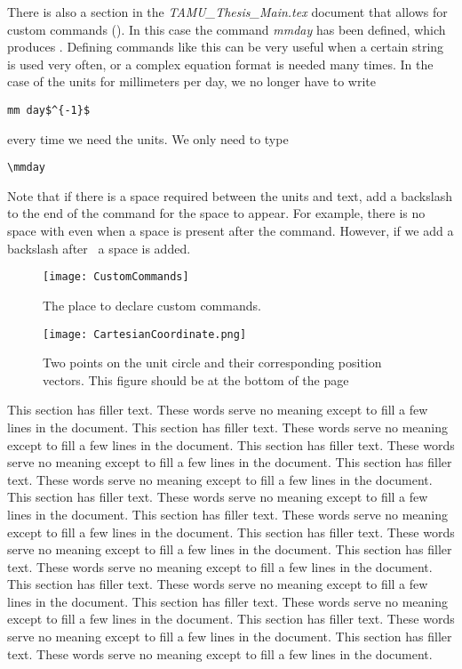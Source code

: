 There is also a section in the \textit{TAMU\_Thesis\_Main.tex} document that allows for custom commands (). In this case the command {\it mmday} has been defined, which produces \mmday. Defining commands like this can be very useful when a certain string is used very often, or a complex equation format is needed many times. In the case of the units for millimeters per day, we no longer have to write
\begin{verbatim}
mm day$^{-1}$
\end{verbatim}
every time we need the units. We only need to type
\begin{verbatim}
\mmday
\end{verbatim}
Note that if there is a space required between the units and text, add a backslash to the end of the command for the space to appear. For example, there is no space with \mmday even when a space is present after the command. However, if we add a backslash after \mmday\ a space is added.

\begin{figure}[ht]
	\centering
	\texttt{[image: CustomCommands]}
	\caption{The place to declare custom commands.}
	\label{fig:custom_commands}
\end{figure}

\begin{figure}[!b]
	\centering
	\texttt{[image: CartesianCoordinate.png]}
	\caption{Two points on the unit circle and their corresponding position vectors. This figure should be at the bottom of the page}
\end{figure}

This section has filler text. These words serve no meaning except to fill a few lines in the document. This section has filler text. These words serve no meaning except to fill a few lines in the document. This section has filler text. These words serve no meaning except to fill a few lines in the document. This section has filler text. These words serve no meaning except to fill a few lines in the document. This section has filler text. These words serve no meaning except to fill a few lines in the document. This section has filler text. These words serve no meaning except to fill a few lines in the document. This section has filler text. These words serve no meaning except to fill a few lines in the document. This section has filler text. These words serve no meaning except to fill a few lines in the document. This section has filler text. These words serve no meaning except to fill a few lines in the document. This section has filler text. These words serve no meaning except to fill a few lines in the document. This section has filler text. These words serve no meaning except to fill a few lines in the document. This section has filler text. These words serve no meaning except to fill a few lines in the document.

